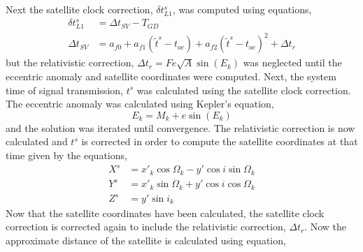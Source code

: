 Next the satellite clock correction, $\delta t_{L1}^s$, was computed using equations,
\begin{align*}
	\delta t_{L1}^s &= \Delta t_{SV}-T_{GD} \\
	\Delta t_{SV} &= a_{f0} + a_{f1}(\tilde{t}^s - t_{oc}) + a_{f2}(\tilde{t}^s - t_{oc})^2 + \Delta t_r
\end{align*}
but the relativistic correction, $\Delta t_r = Fe\sqrt{A} \sin(E_k)$ was neglected until the eccentric anomaly and satellite coordinates were computed.  Next, the system time of signal transmission, $t^s$ was calculated using the satellite clock correction. The eccentric anomaly was calculated using Kepler's equation,
\begin{equation*}
	E_k = M_k + e \sin(E_k)
\end{equation*}
 and the solution was iterated until convergence.  The relativistic correction is now calculated and $t^s$ is corrected in order to compute the satellite coordinates at that time given by the equations,
 \begin{align}
 	X^s &=x'_k \cos \Omega_k -y' \cos i \sin \Omega_k \nonumber \\
	Y^s &=x'_k \sin \Omega_k +y' \cos i \cos \Omega_k \nonumber \\
	Z^s &= y' \sin i_k  \nonumber
 \end{align}
 Now that the satellite coordinates have been calculated, the satellite clock correction is corrected again to include the relativistic correction, $\Delta t_r$.  Now the approximate distance of the satellite is calculated using equation,
 
